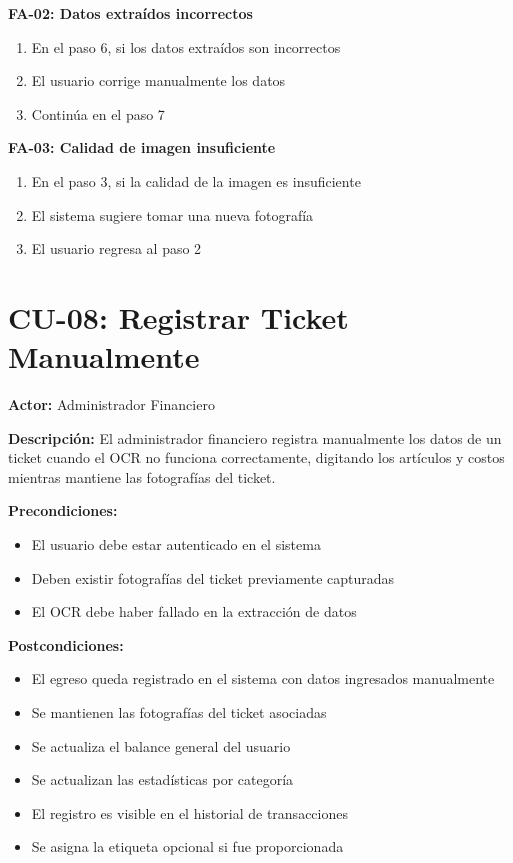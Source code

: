 \textbf{FA-02: Datos extraídos incorrectos}
\begin{enumerate}
    \item En el paso 6, si los datos extraídos son incorrectos
    \item El usuario corrige manualmente los datos
    \item Continúa en el paso 7
\end{enumerate}

\textbf{FA-03: Calidad de imagen insuficiente}
\begin{enumerate}
    \item En el paso 3, si la calidad de la imagen es insuficiente
    \item El sistema sugiere tomar una nueva fotografía
    \item El usuario regresa al paso 2
\end{enumerate}

\section{CU-08: Registrar Ticket Manualmente}

\noindent\textbf{Actor:} Administrador Financiero

\noindent\textbf{Descripción:} El administrador financiero registra manualmente los datos de un ticket cuando el OCR no funciona correctamente, digitando los artículos y costos mientras mantiene las fotografías del ticket.

\noindent\textbf{Precondiciones:}
\begin{itemize}
    \item El usuario debe estar autenticado en el sistema
    \item Deben existir fotografías del ticket previamente capturadas
    \item El OCR debe haber fallado en la extracción de datos
\end{itemize}

\noindent\textbf{Postcondiciones:}
\begin{itemize}
    \item El egreso queda registrado en el sistema con datos ingresados manualmente
    \item Se mantienen las fotografías del ticket asociadas
    \item Se actualiza el balance general del usuario
    \item Se actualizan las estadísticas por categoría
    \item El registro es visible en el historial de transacciones
    \item Se asigna la etiqueta opcional si fue proporcionada
\end{itemize}

